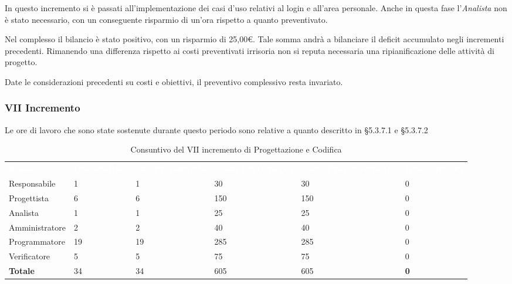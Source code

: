 In questo incremento si è passati all'implementazione dei casi d'uso relativi al login e all'area personale. Anche in questa fase l'\textit{Analista} non è stato necessario, con un conseguente risparmio di un'ora rispetto a quanto preventivato. 

Nel complesso il bilancio è stato positivo, con un risparmio di 25,00\euro. Tale somma andrà a bilanciare il deficit accumulato negli incrementi precedenti. Rimanendo una differenza rispetto ai costi preventivati irrisoria non si reputa necessaria una ripianificazione delle attività di progetto.

Date le considerazioni precedenti su costi e obiettivi, il preventivo complessivo resta invariato.


\pagebreak


\subsubsection{VII Incremento}
Le ore di lavoro che sono state sostenute durante questo periodo sono relative a quanto descritto in §5.3.7.1 e §5.3.7.2

\begin{table}[H]
\begin{center}
\renewcommand{\arraystretch}{1.5}
\begin{tabular}{ m{}<{\centering}  m{}<{\centering} m{}<{\centering} m{}<{\centering} m{}<{\centering} m{}<{\centering}}
	\rowcolor{darkblue}
	\textcolor{white}{\textbf{Ruolo}} & \textcolor{white}{\textbf{Ore Effettive}} & \textcolor{white}{\textbf{Ore Preventivate}}&\textcolor{white}{\textbf{Costo Effettivo (\euro)}}&\textcolor{white}{\textbf{Costo Preventivato (\euro)}}&\textcolor{white}{\textbf{Differenza (\euro)}}\\ 

	Responsabile  & 1 & 1 & 30 & 30 & 0\\	
	
	Progettista & 6 & 6 & 150 & 150 & 0\\
	
	Analista & 1 & 1 & 25 & 25 & 0\\
	
	Amministratore & 2 & 2 & 40 & 40 & 0\\
	
	Programmatore & 19 & 19 & 285 & 285 & 0\\
	
	Verificatore & 5 & 5 & 75 & 75 & 0\\
	
	\textbf{Totale} & 34 & 34 & 605 & 605 & \textbf{0} \\
	
\end{tabular}
\caption{Consuntivo del VII incremento di Progettazione e Codifica}
\end{center}
\end{table}


